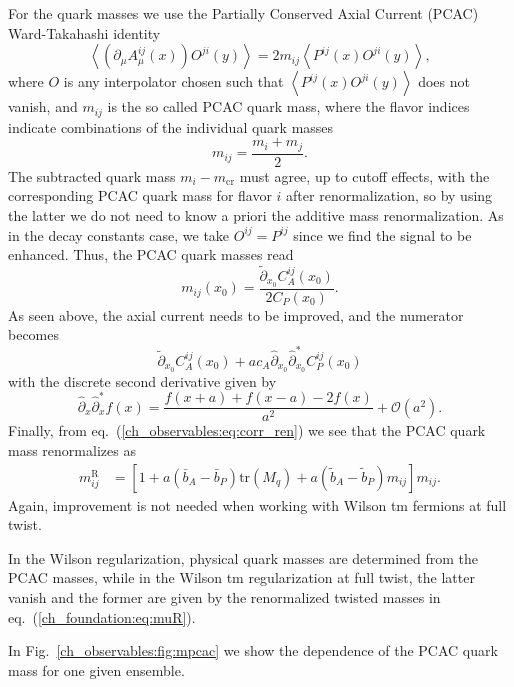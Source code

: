 For the quark masses we use the Partially Conserved Axial Current (PCAC) Ward-Takahashi identity
\begin{equation}
\label{ch_observables:eq:PCAC}
\left<\left(\partial_{\mu}A^{ij}_{\mu}(x)\right)O^{ji}(y)\right>=2m_{ij}\left<P^{ij}(x)O^{ji}(y)\right>,
\end{equation}
where $O$ is any interpolator chosen such that $\left<P^{ij}(x)O^{ji}(y)\right>$ does not vanish, and $m_{ij}$ is the so called PCAC quark mass, where the flavor indices indicate combinations of the individual quark masses
\begin{equation}
m_{ij}=\frac{m_i+m_{j}}{2}.
\end{equation}
The subtracted quark mass $m_{i}-m_{\textrm{cr}}$ must agree, up to cutoff effects, with the corresponding PCAC quark mass for flavor $i$ after renormalization, so by using the latter we do not need to know a priori the additive mass renormalization. As in the decay constants case, we take $O^{ij}=P^{ij}$ since we find the signal to be enhanced. Thus, the PCAC quark masses read
\begin{equation}
m_{ij}(x_0)=\frac{\tilde{\partial}_{x_0}C_A^{ij}(x_0)}{2C_P(x_0)}.
\end{equation}
As seen above, the axial current needs to be improved, and the numerator becomes
\begin{equation}
\tilde{\partial}_{x_0}C_A^{ij}(x_0)+ac_A\hat{\partial}_{x_0}\hat{\partial}^*_{x_0}C_P^{ij}(x_0)
\end{equation}
with the discrete second derivative given by
\begin{equation}
\hat{\partial}_{x}\hat{\partial}^*_xf(x)=\frac{f(x+a)+f(x-a)-2f(x)}{a^2}+\mathcal{O}(a^2).
\end{equation}
Finally, from eq.~(\ref{ch_observables:eq:corr_ren}) we see that the PCAC quark mass renormalizes as
\begin{align}
m_{ij}^{\textrm{R}}&=\left[1+a\left(\bar{b}_A-\bar{b}_P\right){\textrm{tr}}\left(M_q\right)+a\left(\tilde{b}_A-\tilde{b}_P\right)m_{ij}\right]m_{ij}.
\end{align}
Again, improvement is not needed when working with Wilson tm fermions at full twist.

In the Wilson regularization, physical quark masses are determined from the PCAC masses, while in the Wilson tm regularization at full twist, the latter vanish and the former are given by the renormalized twisted masses in eq.~(\ref{ch_foundation:eq:muR}).

In Fig.~\ref{ch_observables:fig:mpcac} we show the dependence of the PCAC quark mass for one given ensemble.

